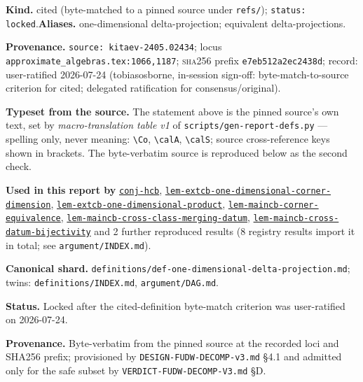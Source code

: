 \begin{defnote}
\textbf{Kind.} cited (byte-matched to a pinned source under \texttt{refs/}); \texttt{status: locked}.\quad\textbf{Aliases.} one-dimensional delta-projection; equivalent delta-projections.
\par
\textbf{Provenance.} \texttt{source: kitaev-\allowbreak{}2405.\allowbreak{}02434}; locus \texttt{approximate\_algebras.\allowbreak{}tex:\allowbreak{}1066,\allowbreak{}1187}; \textsc{sha256} prefix \texttt{e7eb512a2ec2438d}; record: user-\allowbreak{}ratified 2026-\allowbreak{}07-\allowbreak{}24 (tobiasosborne,\allowbreak{} in-\allowbreak{}session sign-\allowbreak{}off:\allowbreak{} byte-\allowbreak{}match-\allowbreak{}to-\allowbreak{}source criterion for cited;\allowbreak{} delegated ratification for consensus/\allowbreak{}original).
\par
\textbf{Typeset from the source.} The statement above is the pinned source's own text, set by \emph{macro-translation table v1} of \texttt{scripts/gen-report-defs.py} --- spelling only, never meaning: \texttt{\textbackslash{}Co}, \texttt{\textbackslash{}calA}, \texttt{\textbackslash{}calS}; source cross-reference keys shown in brackets. The byte-verbatim source is reproduced below as the second check.
\par
\textbf{Used in this report by} \hyperref[conj:hcb]{\texttt{conj-\allowbreak{}hcb}}, \hyperref[lem:extcb-one-dimensional-corner-dimension]{\texttt{lem-\allowbreak{}extcb-\allowbreak{}one-\allowbreak{}dimensional-\allowbreak{}corner-\allowbreak{}dimension}}, \hyperref[lem:extcb-one-dimensional-product]{\texttt{lem-\allowbreak{}extcb-\allowbreak{}one-\allowbreak{}dimensional-\allowbreak{}product}}, \hyperref[lem:maincb-corner-equivalence]{\texttt{lem-\allowbreak{}maincb-\allowbreak{}corner-\allowbreak{}equivalence}}, \hyperref[lem:maincb-cross-class-merging-datum]{\texttt{lem-\allowbreak{}maincb-\allowbreak{}cross-\allowbreak{}class-\allowbreak{}merging-\allowbreak{}datum}}, \hyperref[lem:maincb-cross-datum-bijectivity]{\texttt{lem-\allowbreak{}maincb-\allowbreak{}cross-\allowbreak{}datum-\allowbreak{}bijectivity}} and 2 further reproduced results (8 registry results import it in total; see \texttt{argument/INDEX.md}).
\par
\textbf{Canonical shard.} \texttt{definitions/\allowbreak{}def-\allowbreak{}one-\allowbreak{}dimensional-\allowbreak{}delta-\allowbreak{}projection.\allowbreak{}md}; twins: \texttt{definitions/INDEX.md}, \texttt{argument/DAG.md}.
\par
\textbf{Status.} Locked after the cited-definition byte-match criterion was user-ratified on 2026-07-24.

\textbf{Provenance.} Byte-verbatim from the pinned source at the recorded loci
and SHA256 prefix; provisioned by \texttt{DESIGN-\allowbreak{}FUDW-\allowbreak{}DECOMP-\allowbreak{}v3.\allowbreak{}md} \S{}4.1 and admitted
only for the safe subset by \texttt{VERDICT-\allowbreak{}FUDW-\allowbreak{}DECOMP-\allowbreak{}V3.\allowbreak{}md} \S{}D.
\end{defnote}
